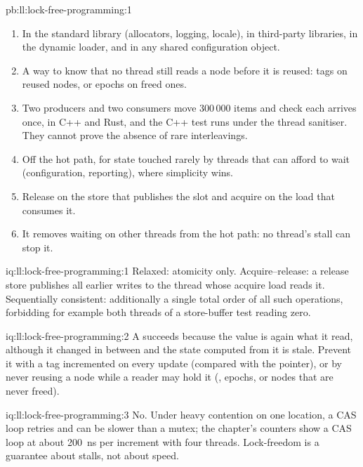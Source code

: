 \begin{solution}{pb:ll:lock-free-programming:1}
\begin{enumerate}
\item In the standard library (allocators, logging, locale), in third-party libraries, in the dynamic loader, and in any shared
configuration object.
\item A way to know that no thread still reads a node before it is reused: tags on reused nodes,  or epochs on
freed ones.
\item Two producers and two consumers move 300\,000 items and check each arrives once, in C++ and Rust, and the C++ test runs under
the thread sanitiser. They cannot prove the absence of rare interleavings.
\item Off the hot path, for state touched rarely by threads that can afford to wait (configuration, reporting), where simplicity
wins.
\item Release on the store that publishes the slot and acquire on the load that consumes it.
\item It removes waiting on other threads from the hot path: no thread's stall can stop it.
\end{enumerate}
\end{solution}

\begin{solution}{iq:ll:lock-free-programming:1}
Relaxed: atomicity only. Acquire--release: a release store publishes all earlier writes to the thread whose acquire load reads
it. Sequentially consistent: additionally a single total order of all such operations, forbidding for example both threads of a
store-buffer test reading zero.
\end{solution}

\begin{solution}{iq:ll:lock-free-programming:2}
A  succeeds because the value is again what it read, although it changed in between and the state computed from
it is stale. Prevent it with a tag incremented on every update (compared with the pointer), or by never reusing a node while a
reader may hold it (, epochs, or nodes that are never freed).
\end{solution}

\begin{solution}{iq:ll:lock-free-programming:3}
No. Under heavy contention on one location, a CAS loop retries and can be slower than a mutex; the chapter's counters show a CAS
loop at about \qty{200}{\nano\second} per increment with four threads. Lock-freedom is a guarantee about stalls, not about speed.
\end{solution}


